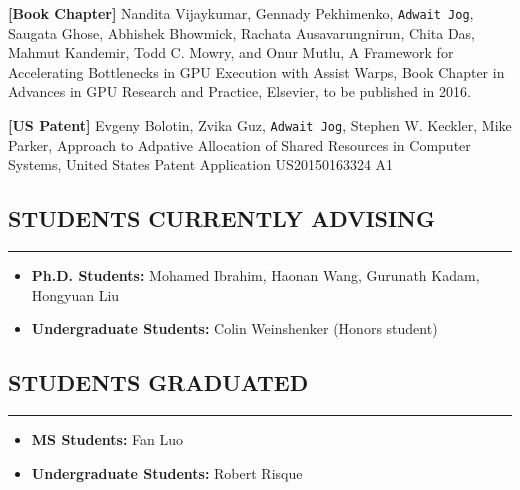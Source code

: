 \documentclass[10pt,a4]{article}
\begin{document}
\begin{description}

\item{\bf [Book Chapter]}
Nandita Vijaykumar, Gennady Pekhimenko, {\tt Adwait Jog}, Saugata Ghose, Abhishek Bhowmick, 
Rachata Ausavarungnirun, Chita Das, Mahmut Kandemir, Todd C. Mowry, and Onur Mutlu, 
A Framework for Accelerating Bottlenecks in GPU Execution with Assist Warps, 
Book Chapter in Advances in GPU Research and Practice, Elsevier, to be published in 2016. 

\item{\bf [US Patent]}
Evgeny Bolotin, Zvika Guz, {\tt Adwait Jog}, Stephen W. Keckler, Mike Parker, 
Approach to Adpative Allocation of Shared Resources in Computer Systems, 
United States Patent Application US20150163324 A1 

\end{description}

\subsection*{STUDENTS CURRENTLY ADVISING}
\hrule
\vspace{0.2cm}
\begin{itemize}
\item {\bf Ph.D. Students:} Mohamed Ibrahim, Haonan Wang, Gurunath Kadam, Hongyuan Liu
\item {\bf Undergraduate Students:}  Colin Weinshenker (Honors student)
\end{itemize}

\subsection*{STUDENTS GRADUATED}
\hrule
\vspace{0.2cm}
\begin{itemize}
\item {\bf MS Students:}  Fan Luo 
\item {\bf Undergraduate Students:}  Robert Risque
\end{itemize}
\end{document}
